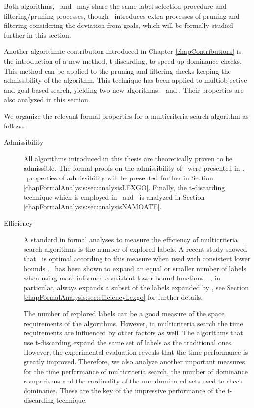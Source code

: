 Both algorithms, \namoa \ and \lexgo \ may share the same label selection procedure and filtering/pruning processes, though \lexgo \ introduces extra processes of pruning and filtering considering the deviation from goals, which will be formally studied further in this section. 

Another algorithmic contribution introduced in Chapter \ref{chapContributions} is the introduction of a new method, t-discarding, to speed up dominance checks. This method can be applied to the pruning and filtering checks keeping the admissibility of the algorithm. This technique has been applied to multiobjective and goal-based search, yielding two new algorithms: 
\namoate \ and \lexgote. Their properties are also analyzed in this section. 

We organize the relevant formal properties for a multicriteria search algorithm as follows: 

\begin{description}
    \item[Admissibility] 

All algorithms introduced in this thesis are theoretically proven to be admissible. The formal proofs on the admissibility of \namoa \ were presented in \citep{Mandow2005, Mandow2010}. \lexgo \ properties of admissibility will be presented further in Section \ref{chapFormalAnalysis:sec:analysisLEXGO}. Finally, the t-discarding technique which is employed in \namoate \ and \lexgote \ is analyzed in Section \ref{chapFormalAnalysis:sec:analysisNAMOATE}. 

    \item[Efficiency] 

A standard in formal analyses to measure the efficiency of multicriteria search algorithms is the number of explored labels. A recent study showed that \namoa \ is optimal according to this measure when used with consistent lower bounds \citep{Mandow2010}. \namoa \ has been shown to expand an equal or smaller number of labels when using more informed consistent lower bound functions \citep{Mandow2010}. \lexgo, in particular, always expands a subset of the labels expanded by \namoa, see Section \ref{chapFormalAnalysis:sec:efficiencyLexgo} for further details. 

The number of explored labels can be a good measure of the space requirements of the algorithms. However, in multicriteria search the time requirements are influenced by other factors as well. The algorithms that use t-discarding expand the same set of labels as the traditional ones. However, the experimental evaluation reveals that the time performance is greatly improved. Therefore, we also analyze another important measures for the time performance of multicriteria search, the number of dominance comparisons and the cardinality of the non-dominated sets used to check dominance. These are the key of the impressive performance of the t-discarding technique. 

\end{description}


